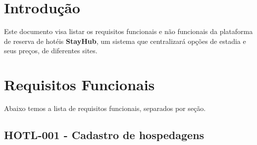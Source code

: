 \documentclass[
    12pt,
    oneside,
    a4paper,
    brazil
]{abntex2}
\begin{document}
\imprimircapa

\tableofcontents*
\cleardoublepage

\OnehalfSpacing

\chapter{Introdução}
Este documento visa listar os requisitos funcionais e não funcionais da plataforma de reserva de hotéis \textbf{StayHub}, um sistema que centralizará opções de estadia e seus preços, de diferentes sites.

\chapter{Requisitos Funcionais}

Abaixo temos a lista de requisitos funcionais, separados por seção.

\section{HOTL-001 - Cadastro de hospedagens}
\end{document}

